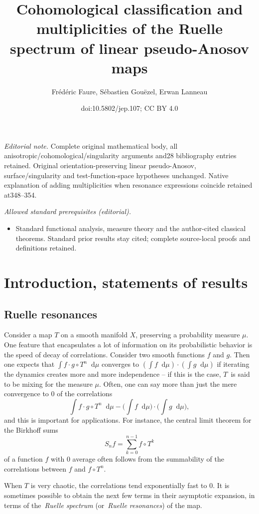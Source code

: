 \documentclass[10pt]{amsart}
\title{Cohomological classification and multiplicities of the Ruelle spectrum of linear pseudo-Anosov maps}
\author{Frédéric Faure, Sébastien Gouëzel, Erwan Lanneau}
\date{doi:10.5802/jep.107; CC BY 4.0}
\newcommand{\dd}{\mathop{}\!\mathrm{d}}
\theoremstyle{definition}
\numberwithin{equation}{section}
\begin{document}
\maketitle
\noindent\textit{Editorial note.} Complete original mathematical body, all anisotropic/cohomological/singularity arguments and28 bibliography entries retained. Original orientation-preserving linear pseudo-Anosov, surface/singularity and test-function-space hypotheses unchanged. Native explanation of adding multiplicities when resonance expressions coincide retained at348–354.\par\medskip
\noindent\textit{Allowed standard prerequisites (editorial).}\begin{itemize}
\item Standard functional analysis, measure theory and the author-cited classical theorems. Standard prior results stay cited; complete source-local proofs and definitions retained.
\end{itemize}\medskip
\tableofcontents


\section{Introduction, statements of results}

\subsection*{Ruelle resonances} Consider a map $T$ on a smooth manifold
$X$, preserving a probability measure $\mu$. One feature that encapsulates a
lot of information on its probabilistic behavior is the speed of decay of
correlations. Consider two smooth functions $f$ and $g$. Then one expects
that $\int f \cdot g \circ T^n \dd \mu$ converges to $(\int f \dd\mu) \cdot
(\int g \dd\mu)$ if iterating the dynamics creates more and more independence
-- if this is the case, $T$~is said to be mixing for the measure $\mu$.
Often, one can say more than just the mere convergence to $0$ of the
correlations
\[
\int f \cdot g \circ T^n \dd \mu - \biggl(\int f \dd\mu\biggr) \cdot \biggl(\int
g \dd\mu\biggr),
\]
and this is important for applications. For instance, the central
limit theorem for the Birkhoff sums
\[
S_n f = \sum_{k=0}^{n-1} f \circ T^k
\]
of
a function $f$ with $0$ average often follows from the summability of the
correlations between $f$ and $f\circ T^n$.

When $T$ is very chaotic, the correlations tend exponentially fast to $0$. It
is sometimes possible to obtain the next few terms in their asymptotic
expansion, in terms of the~\emph{Ruelle spectrum} (or~\emph{Ruelle
resonances}) of the map.
\end{document}
